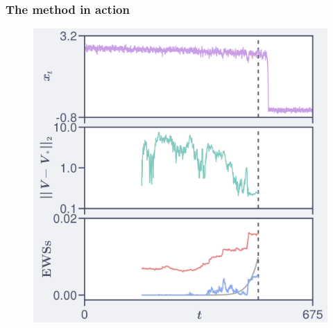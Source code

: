 \documentclass[./main.tex]{subfiles}
\begin{document}
\begin{frame}[t, label=slide04]
        \frametitle{The method in action}

        \footnotesize

        \begin{figure}[H]
            \centering 
            \includegraphics[keepaspectratio, height=0.85\textheight]{./figures/slide_04.png}
        \end{figure}
        
\end{frame}
\end{document}
